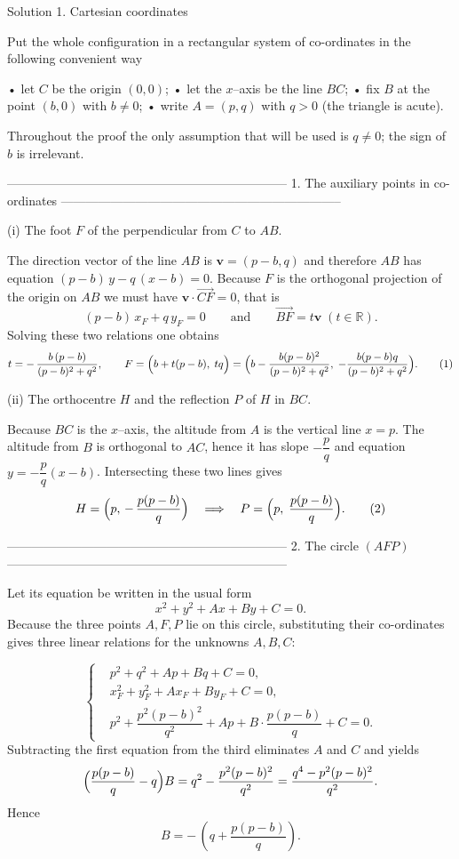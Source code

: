 Solution 1.  Cartesian coordinates  

Put the whole configuration in a rectangular system of co-ordinates in the
following convenient way

•  let $C$ be the origin $(0,0)$;  
•  let the $x$–axis be the line $BC$;  
•  fix $B$ at the point $(b,0)$ with $b\ne 0$;  
•  write $A=(p,q)$ with $q>0$ (the triangle is acute).

Throughout the proof the only assumption that will be used is $q\neq 0$; the
sign of $b$ is irrelevant.

--------------------------------------------------------------------
1.  The auxiliary points in co-ordinates
--------------------------------------------------------------------

(i)  The foot $F$ of the perpendicular from $C$ to $AB$.

The direction vector of the line $AB$ is
$\mathbf v=(p-b,q)$ and therefore
$AB$ has equation
$\displaystyle (p-b)\,y-q\,(x-b)=0$.
Because $F$ is the orthogonal projection of the origin on $AB$ we must have
$\mathbf v\cdot\overrightarrow{CF}=0$,  that is
\[
(p-b)\,x_{F}+q\,y_{F}=0\qquad\text{and}\qquad
\overrightarrow{BF}=t\mathbf v\; (t\in\mathbb R).
\]
Solving these two relations one obtains
\[
t=-\,\frac{b\,(p-b)}{(p-b)^2+q^2},\qquad
F=\Bigl(b+t(p-b),\;tq\Bigr)
      =\Bigl(b-\frac{b(p-b)^2}{(p-b)^2+q^2},\;
             -\frac{b(p-b)q}{(p-b)^2+q^2}\Bigr).      \tag{1}
\]

(ii)  The orthocentre $H$ and the reflection $P$ of $H$ in $BC$.

Because $BC$ is the $x$–axis, the altitude from $A$ is the vertical line
$x=p$.  
The altitude from $B$ is orthogonal to $AC$, hence it has slope
$-\dfrac{p}{q}$ and equation $y=-\dfrac{p}{q}(x-b)$.  
Intersecting these two lines gives
\[
H=\Bigl(p,\,-\,\frac{p(p-b)}{q}\Bigr)\quad\Longrightarrow\quad
P=\Bigl(p,\;\frac{p(p-b)}{q}\Bigr).                           \tag{2}
\]

--------------------------------------------------------------------
2.  The circle $(AFP)$
--------------------------------------------------------------------

Let its equation be written in the usual form
\[
x^{2}+y^{2}+Ax+By+C=0.                                    \tag{$\ast$}
\]
Because the three points $A,F,P$ lie on this circle, substituting their
co-ordinates gives three linear relations for the unknowns $A,B,C$:

\[
\left\{
\begin{aligned}
&p^{2}+q^{2}+Ap+Bq+C=0,\\[2pt]
&x_{F}^{2}+y_{F}^{2}+Ax_{F}+By_{F}+C=0,\\[2pt]
&p^{2}+\dfrac{p^{2}(p-b)^{2}}{q^{2}}+Ap+
     B\cdot\dfrac{p(p-b)}{q}+C=0.
\end{aligned}
\right.
\]
Subtracting the first equation from the third eliminates $A$ and $C$ and
yields
\[
\Bigl(\dfrac{p(p-b)}{q}-q\Bigr)B
          =q^{2}-\dfrac{p^{2}(p-b)^{2}}{q^{2}}
          =\dfrac{q^{4}-p^{2}(p-b)^{2}}{q^{2}}.
\]
Hence
\[
B=-\,(q+\dfrac{p(p-b)}{q}).                              \tag{3}
\]

